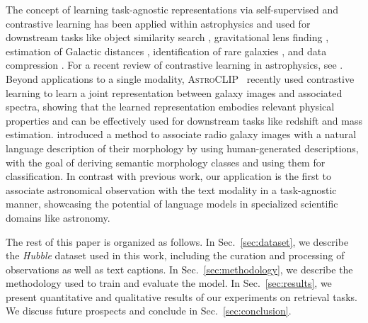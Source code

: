 \documentclass{article} %
\newcommand{\hubble}{\emph{Hubble}\xspace}
\begin{document}
   The concept of learning task-agnostic representations via self-supervised and contrastive learning has been applied within astrophysics \citep{slijepcevic2024radio,stein2021self,hayat2021self,slijepcevic2022learning} and used for downstream tasks like object similarity search \citep{stein2021self}, gravitational lens finding \citep{stein2022mining}, estimation of Galactic distances \citep{hayat2021estimating}, identification of rare galaxies \citep{walmsley2023rare}, and data compression \citep{akhmetzhanova2024data}. For a recent review of contrastive learning in astrophysics, see \citet{huertas2023brief}. 
   Beyond applications to a single modality, \textsc{AstroCLIP}~\citep{lanusse2023astroclip} recently used contrastive learning to learn a joint representation between galaxy images and associated spectra, showing that the learned representation embodies relevant physical properties and can be effectively used for downstream tasks like redshift and mass estimation.
   \citet{bowles2023radio,bowles2022new} introduced a method to associate radio galaxy images with a natural language description of their morphology by using human-generated descriptions, with the goal of deriving semantic morphology classes and using them for classification.
  In contrast with previous work, our application is the first to associate astronomical observation with the text modality in a task-agnostic manner, showcasing the potential of language models in specialized scientific domains like astronomy.

   
   
  The rest of this paper is organized as follows.
%
In Sec.~\ref{sec:dataset}, we describe the \hubble dataset used in this work, including the curation and processing of observations as well as text captions.
%
In Sec.~\ref{sec:methodology}, we describe the methodology used to train and evaluate the model.
%
In Sec.~\ref{sec:results}, we present quantitative and qualitative results of our experiments on retrieval tasks.
%
We discuss future prospects and conclude in Sec.~\ref{sec:conclusion}.
\end{document}
